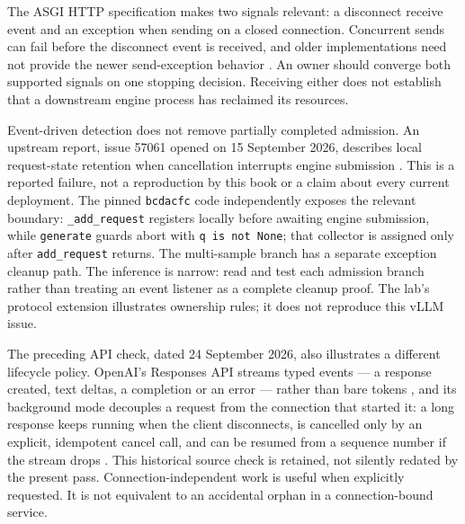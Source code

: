 
The ASGI HTTP specification makes two signals relevant: a disconnect receive
event and an exception when sending on a closed connection. Concurrent sends
can fail before the disconnect event is received, and older implementations
need not provide the newer send-exception behavior
\cite{asgi2026disconnect}. An owner should converge both supported
signals on one stopping decision. Receiving either does not establish that
a downstream engine process has reclaimed its resources.

Event-driven detection does not remove partially completed admission.
An upstream report, issue 57061 opened on 15 September 2026, describes local
request-state retention when cancellation interrupts engine submission
\cite{vllm2026admissioncancel}. This is a reported failure, not a
reproduction by this book or a claim about every current deployment.
The pinned \texttt{bcdacfc} code independently exposes the relevant
boundary: \texttt{\_add\_request} registers locally before awaiting
engine submission, while \texttt{generate} guards abort with
\texttt{q is not None}; that collector is assigned only after
\texttt{add\_request} returns. The multi-sample branch has a separate
exception cleanup path. The inference is narrow: read and test each
admission branch rather than treating an event listener as a complete
cleanup proof. The lab's protocol extension illustrates ownership rules;
it does not reproduce this vLLM issue.

The preceding API check, dated 24 September 2026, also illustrates a
different lifecycle policy. OpenAI's Responses API
streams typed events --- a response created, text deltas, a completion or an
error --- rather than bare tokens \cite{openai2026streaming}, and its
background mode decouples a request from the connection that started it:
a long response keeps running when the client disconnects, is cancelled only
by an explicit, idempotent cancel call, and can be resumed from a sequence
number if the stream drops \cite{openai2026background}. This historical
source check is retained, not silently redated by the present pass.
Connection-independent work is useful when explicitly requested. It is
not equivalent to an accidental orphan in a connection-bound service.


